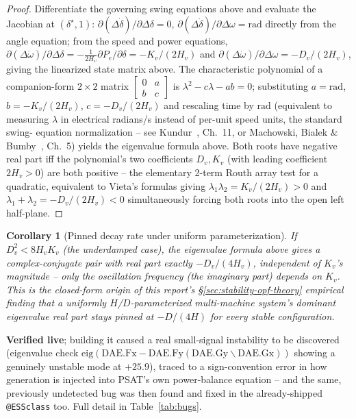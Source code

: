 \documentclass[11pt]{report}
\theoremstyle{plain}
\newtheorem{corollary}[theorem]{Corollary}
\theoremstyle{definition}
\theoremstyle{remark}
\begin{document}
\begin{proof}
Differentiate the governing swing equations above and evaluate the
Jacobian at $(\delta^\star,1)$: $\partial(\Delta\dot\delta)/
\partial\Delta\delta=0$, $\partial(\Delta\dot\delta)/\partial\Delta
\omega=\text{rad}$ directly from the angle equation; from the speed
and power equations, $\partial(\Delta\dot\omega)/
\partial\Delta\delta=-\tfrac1{2H_v}\partial P_e/\partial\delta=
-K_v/(2H_v)$ and $\partial(\Delta\dot\omega)/\partial\Delta\omega=
-D_v/(2H_v)$, giving the linearized state matrix above. The characteristic
polynomial of a companion-form $2\times2$ matrix
$\begin{bmatrix}0&a\\b&c\end{bmatrix}$ is $\lambda^2-c\lambda-ab=0$;
substituting $a=\text{rad}$, $b=-K_v/(2H_v)$, $c=-D_v/(2H_v)$ and
rescaling time by $\text{rad}$ (equivalent to measuring $\lambda$ in
electrical radians/s instead of per-unit speed units, the standard swing-
equation normalization -- see Kundur~\cite{kundur}, Ch.~11, or Machowski,
Bialek \& Bumby~\cite{machowski}, Ch.~5) yields the eigenvalue formula
above. Both roots have negative real part iff the
polynomial's two coefficients $D_v,K_v$ (with leading coefficient
$2H_v>0$) are both positive -- the elementary 2-term Routh array test
for a quadratic, equivalent to Vieta's formulas giving
$\lambda_1\lambda_2=K_v/(2H_v)>0$ and $\lambda_1+\lambda_2=-D_v/(2H_v)<0$
simultaneously forcing both roots into the open left half-plane.
\end{proof}

\begin{corollary}[Pinned decay rate under uniform parameterization]
\label{cor:pinned-decay}
If $D_v^2<8H_vK_v$ (the underdamped case), the eigenvalue formula above gives a
complex-conjugate pair with real part exactly $-D_v/(4H_v)$,
\emph{independent of $K_v$'s magnitude} -- only the oscillation
frequency (the imaginary part) depends on $K_v$. This is the closed-form
origin of this report's \S\ref{sec:stability-opf-theory} empirical
finding that a uniformly $H$/$D$-parameterized multi-machine system's
dominant eigenvalue real part stays pinned at $-D/(4H)$ for every stable
configuration.
\end{corollary}

\textbf{Verified live}; building it caused a real small-signal
instability to be discovered (eigenvalue check
$\text{eig}(\text{DAE.Fx}-\text{DAE.Fy}(\text{DAE.Gy}\backslash
\text{DAE.Gx}))$ showing a genuinely unstable mode at $+25.9$), traced
to a sign-convention error in how generation is injected into PSAT's own
power-balance equation -- and the same, previously undetected bug was
then found and fixed in the already-shipped \texttt{@ESSclass} too. Full
detail in Table~\ref{tab:bugs}.
\end{document}
